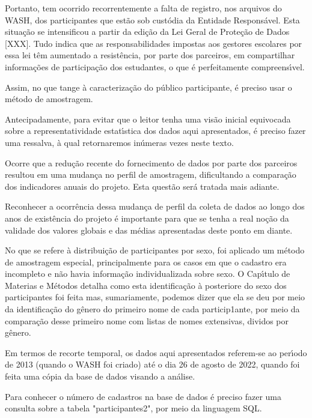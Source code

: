 \documentclass[
12pt,		%
openright,	%
twoside,  %
a4paper,			%
chapter=TITLE,		%
english,			%
french,				%
spanish,			%
brazil				%
]{USPSC-classe/USPSC}
\begin{document}
Portanto, tem ocorrido recorrentemente a falta de registro, nos arquivos do WASH, dos participantes que est\~ao sob cust\'odia da Entidade Respons\'avel. Esta situa\c{c}\~ao se intensificou a partir da edi\c{c}\~ao da Lei Geral de Prote\c{c}\~ao de Dados [XXX]. Tudo indica que as responsabilidades impostas aos gestores escolares por essa lei t\^em aumentado a  resist\^encia, por parte dos parceiros, em compartilhar informa\c{c}\~oes de participa\c{c}\~ao dos estudantes, o que \'e perfeitamente compreens\'{\i}vel.


Assim, no que tange \`a caracteriza\c{c}\~ao do p\'ublico participante, \'e preciso usar o m\'etodo de amostragem.


Antecipadamente, para evitar que o leitor tenha uma vis\~ao inicial equivocada sobre a representatividade estat\'{\i}stica dos dados aqui apresentados, \'e preciso fazer uma ressalva, \`a qual retornaremos in\'umeras vezes neste texto.


Ocorre que a redu\c{c}\~ao recente do fornecimento de dados por parte dos parceiros resultou em uma mudan\c{c}a no perfil de amostragem, dificultando a compara\c{c}\~ao dos indicadores anuais do projeto. Esta quest\~ao ser\'a tratada mais adiante.


Reconhecer a ocorr\^encia dessa mudan\c{c}a de perfil da coleta de dados ao longo dos anos de exist\^encia do projeto \'e importante para que se tenha a real no\c{c}\~ao da validade dos valores globais e das m\'edias apresentadas deste ponto em diante.


No que se refere \`a distribui\c{c}\~ao de participantes por sexo, foi aplicado um m\'etodo de amostragem especial, principalmente para os casos em que o cadastro era incompleto e n\~ao havia informa\c{c}\~ao individualizada sobre sexo. O Cap\'{\i}tulo de Materias e M\'etodos detalha como esta identifica\c{c}\~ao \`a posteriore do sexo dos participantes foi feita mas, sumariamente, podemos dizer que ela se deu por meio da identifica\c{c}\~ao do g\^enero do primeiro nome de cada particip1ante, por meio da compara\c{c}\~ao desse primeiro nome com listas de nomes extensivas, dividos por g\^enero.


Em termos de recorte temporal, os dados aqui apresentados referem-se ao per\'{\i}odo de 2013 (quando o WASH foi criado) at\'e o dia 26 de agosto de 2022, quando foi feita uma c\'opia da base de dados visando a an\'alise.


Para conhecer o n\'umero de cadastros na base de dados \'e preciso fazer uma consulta sobre a tabela "participantes2", por meio da linguagem SQL.
\end{document}
